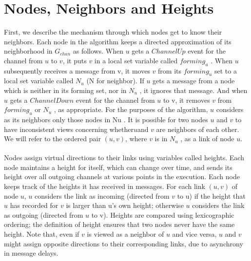 \section{Nodes, Neighbors and Heights}
\paragraph{}First, we describe the mechanism through which nodes get to know their neighbors. Each node in the algorithm keeps a directed approximation of its neighborhood in $G_{chan}$ as follows. When $u$ gets a $ChannelUp$ event for the channel from $u$ to $v$, it puts $v$ in a local set variable called $forming_u$ . When $u$ subsequently receives a message from v, it moves $v$ from its $forming_u$ set to a local set variable called $N_u$ (N for neighbor). If $u$ gets a message from a node which is neither in its forming set, nor in $N_u$ , it ignores that message. And when $u$ gets a $ChannelDown$ event for the channel from $u$ to v, it removes $v$ from $forming_u$ or $N_u$ , as appropriate. For the purposes of the algorithm, $u$ considers as its neighbors only those nodes in Nu . It is possible for two nodes $u$ and $v$ to have inconsistent views concerning whether$u$and $v$ are neighbors of each other. We will refer to the ordered pair $(u, v)$, where $v$ is in $N_u$ , as a link of node $u$.
\paragraph{}Nodes assign virtual directions to their links using variables called heights. Each node maintains a height for itself, which can change over time, and sends its height over all outgoing channels at various points in the execution. Each node keeps track of the heights it has received in messages. For each link $(u, v)$ of node $u$, $u$ considers the link as incoming (directed from $v$ to u) if the height that $u$ has recorded for $v$ is larger than u’s own height; otherwise $u$ considers the link as outgoing (directed from $u$ to v). Heights are compared using lexicographic ordering; the definition of height ensures that two nodes never have the same height. Note that, even if $v$ is viewed as a neighbor of $u$ and vice versa, $u$ and $v$ might assign opposite directions to their corresponding links, due to asynchrony in message delays.
